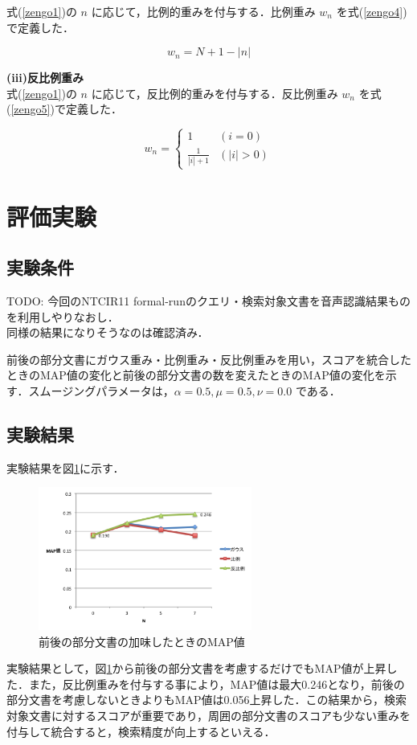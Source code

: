 式(\ref{zengo1})の $n$ に応じて，比例的重みを付与する．比例重み $w_n$ を式(\ref{zengo4})で定義した．

\begin{equation}
    w_n = N+1-|n|
    \label{zengo4}
\end{equation}

{\bf(iii)反比例重み} \\

式(\ref{zengo1})の $n$ に応じて，反比例的重みを付与する．反比例重み $w_n$ を式(\ref{zengo5})で定義した．

\begin{equation}
    w_n = 
    \begin{cases} 
        1 & (i = 0)\\ 
        \frac{1}{|i|+1} & (|i| > 0)
    \end{cases} 
    \label{zengo5}
\end{equation}

\section{評価実験}
\subsection{実験条件}

{\Large TODO: 今回のNTCIR11 formal-runのクエリ・検索対象文書を音声認識結果ものを利用しやりなおし． \\
同様の結果になりそうなのは確認済み．}

前後の部分文書にガウス重み・比例重み・反比例重みを用い，スコアを統合したときのMAP値の変化と前後の部分文書の数を変えたときのMAP値の変化を示す．スムージングパラメータは，$\alpha= 0.5, \mu= 0.5, \nu= 0.0$ である．

\subsection{実験結果}
実験結果を図\ref{web_result1}に示す．

\begin{figure}[htbp]
    \centering
    \includegraphics[width=7cm]{./image/zengo.png}
    \caption{前後の部分文書の加味したときのMAP値}
    \label{web_result1}
\end{figure}

実験結果として，図\ref{web_result1}から前後の部分文書を考慮するだけでもMAP値が上昇した．また，反比例重みを付与する事により，MAP値は最大0.246となり，前後の部分文書を考慮しないときよりもMAP値は0.056上昇した．この結果から，検索対象文書に対するスコアが重要であり，周囲の部分文書のスコアも少ない重みを付与して統合すると，検索精度が向上するといえる．

